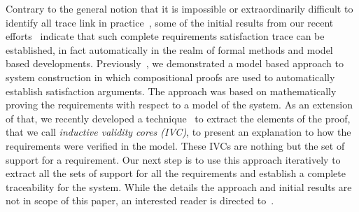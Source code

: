 Contrary to the general notion that it is impossible or extraordinarily difficult to identify all trace link in practice~\cite{stravsunskas2002traceability}, some of the initial results from our recent efforts~\cite{2016arXiv160304276G} indicate that such complete requirements satisfaction trace can be established, in fact automatically in the realm of formal methods and model based developments. 
Previously~\cite{hilt2013}, we demonstrated a model based approach to system construction in which compositional proofs are used to automatically establish satisfaction arguments. The approach was based on mathematically proving the requirements with respect to a model of the system. As an extension of that, we recently developed a technique~\cite{2016arXiv160304276G} to extract the elements of the proof, that we call {\em inductive validity cores (IVC)}, to present an explanation to how the requirements were verified in the model. These IVCs are nothing but the set of support for a requirement. Our next step is to use this approach iteratively to extract all the sets of support for all the requirements and establish a complete traceability for the system. While the details the approach and initial results are not in scope of this paper, an interested reader is directed to~\cite{2016arXiv160304276G}.

